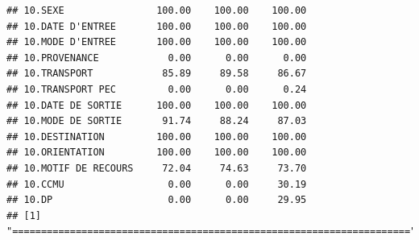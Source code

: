 \documentclass[]{article}
\begin{document}
\begin{verbatim}
## 10.SEXE                100.00    100.00    100.00
## 10.DATE D'ENTREE       100.00    100.00    100.00
## 10.MODE D'ENTREE       100.00    100.00    100.00
## 10.PROVENANCE            0.00      0.00      0.00
## 10.TRANSPORT            85.89     89.58     86.67
## 10.TRANSPORT PEC         0.00      0.00      0.24
## 10.DATE DE SORTIE      100.00    100.00    100.00
## 10.MODE DE SORTIE       91.74     88.24     87.03
## 10.DESTINATION         100.00    100.00    100.00
## 10.ORIENTATION         100.00    100.00    100.00
## 10.MOTIF DE RECOURS     72.04     74.63     73.70
## 10.CCMU                  0.00      0.00     30.19
## 10.DP                    0.00      0.00     29.95
## [1] "====================================================================="
\end{verbatim}
\end{document}
